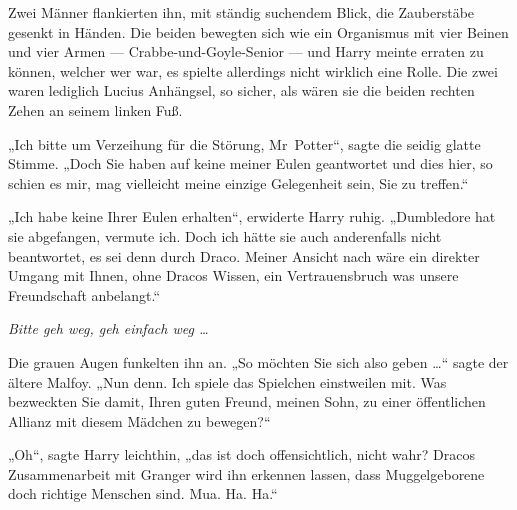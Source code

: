 Zwei Männer flankierten ihn, mit ständig suchendem Blick, die Zauberstäbe gesenkt in Händen. Die beiden bewegten sich wie ein Organismus mit vier Beinen und vier Armen — Crabbe-und-Goyle-Senior — und Harry meinte erraten zu können, welcher wer war, es spielte allerdings nicht wirklich eine Rolle. Die zwei waren lediglich Lucius Anhängsel, so sicher, als wären sie die beiden rechten Zehen an seinem linken Fuß.

„Ich bitte um Verzeihung für die Störung, Mr~Potter“, sagte die seidig glatte Stimme.
„Doch Sie haben auf keine meiner Eulen geantwortet und dies hier, so schien es mir, mag vielleicht meine einzige Gelegenheit sein, Sie zu treffen.“

„Ich habe keine Ihrer Eulen erhalten“, erwiderte Harry ruhig.
„Dumbledore hat sie abgefangen, vermute ich. Doch ich hätte sie auch anderenfalls nicht beantwortet, es sei denn durch Draco. Meiner Ansicht nach wäre ein direkter Umgang mit Ihnen, ohne Dracos Wissen, ein Vertrauensbruch was unsere Freundschaft anbelangt.“

\emph{Bitte geh weg, geh einfach weg …}

Die grauen Augen funkelten ihn an.
„So möchten Sie sich also geben …“ sagte der ältere Malfoy.
„Nun denn. Ich spiele das Spielchen einstweilen mit. Was bezweckten Sie damit, Ihren guten Freund, meinen Sohn, zu einer öffentlichen Allianz mit diesem Mädchen zu bewegen?“

„Oh“, sagte Harry leichthin, „das ist doch offensichtlich, nicht wahr? Dracos Zusammenarbeit mit Granger wird ihn erkennen lassen, dass Muggelgeborene doch richtige Menschen sind. Mua. Ha. Ha.“

